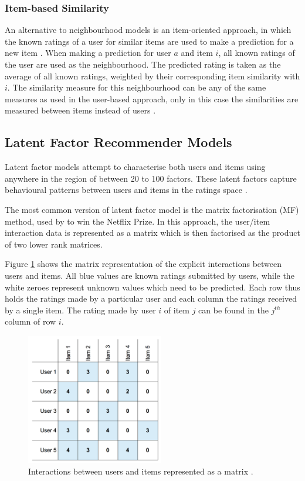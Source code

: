 \subsubsection{Item-based Similarity}
An alternative to neighbourhood models is an item-oriented approach, in which the known ratings of a user for similar items are used to make a prediction for a new item \parencite{cf_1.6_implicit}. When making a prediction for user $a$ and item $i$, all known ratings of the user are used as the neighbourhood. The predicted rating is taken as the average of all known ratings, weighted by their corresponding item similarity with $i$. The similarity measure for this neighbourhood can be any of the same measures as used in the user-based approach, only in this case the similarities are measured between items instead of users \parencite{handbook_1.4_neighbourhood}.

\subsection{Latent Factor Recommender Models}
Latent factor models attempt to characterise both users and items using anywhere in the region of between 20 to 100 factors. These latent factors capture behavioural patterns between users and items in the ratings space \parencite{koren2009matrix}.

The most common version of latent factor model is the matrix factorisation (MF) method, used by \cite{bellkor_2008} to win the Netflix Prize. In this approach, the user/item interaction data is represented as a matrix which is then factorised as the product of two lower rank matrices. 

Figure \ref{fig:2_matrix-decomposition} shows the matrix representation of the explicit interactions between users and items. All blue values are known ratings submitted by users, while the white zeroes represent unknown values which need to be predicted. Each row thus holds the ratings made by a particular user and each column the ratings received by a single item. The rating made by user $i$ of item $j$ can be found in the $j^{th}$ column of row $i$.

\begin{figure}[H]
\centering
\includegraphics[width=6cm]{Figures/2_3_matrix.png}
\decoRule
\caption[Ratings matrix]{Interactions between users and items represented as a matrix \parencite{bailey_2016}.}
\label{fig:2_matrix-decomposition}
\end{figure}

